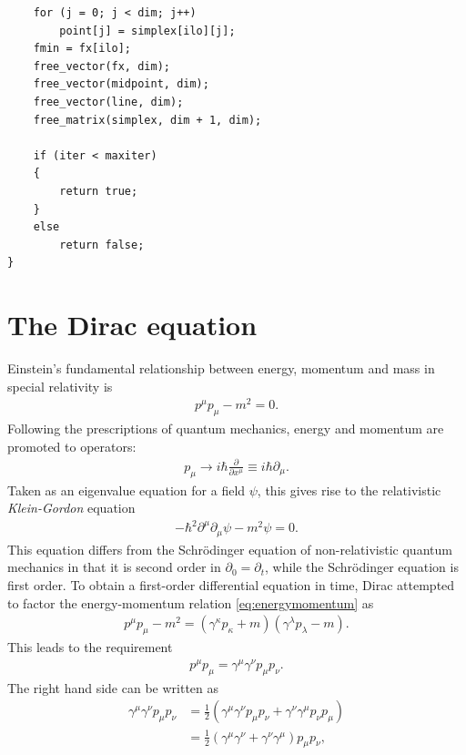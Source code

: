 \documentclass[twoside,english]{uiofysmaster}
\begin{document}
\begin{lstlisting}
	for (j = 0; j < dim; j++)
		point[j] = simplex[ilo][j];
	fmin = fx[ilo];
	free_vector(fx, dim);
	free_vector(midpoint, dim);
	free_vector(line, dim);
	free_matrix(simplex, dim + 1, dim);

	if (iter < maxiter)
	{
		return true;
	}
	else
		return false;
}
\end{lstlisting}




\chapter{The Dirac equation}
\label{appendix:diraceq}

Einstein's fundamental relationship between energy, momentum and mass in special relativity is
\begin{align}
  p^\mu p_\mu - m^2 = 0.\label{eq:energymomentum}
\end{align}
Following the prescriptions of quantum mechanics, energy and momentum are promoted to operators:
\begin{align}
	p_\mu \to i\hbar \frac{\partial}{\partial x^\mu} \equiv i\hbar \partial_\mu.
\end{align}
Taken as an eigenvalue equation for a field $\psi$, this gives rise to the relativistic {\it Klein-Gordon} equation
\begin{align}
	-\hbar^2 \partial^\mu \partial_\mu \psi - m^2 \psi = 0.
\end{align}
This equation differs from the Schr\"{o}dinger equation of non-relativistic quantum mechanics in that it is second order in $\partial_{0} = \partial_t$, while the Schr\"{o}dinger equation is first order. To obtain a first-order differential equation in time, Dirac attempted \cite{griffiths:elementary_particles} to factor the energy-momentum relation \eqref{eq:energymomentum} as
\begin{align}
	p^\mu p_\mu - m^2 = \left(\gamma^\kappa p_\kappa + m\right)\left(\gamma^\lambda p_\lambda - m\right).
\end{align}
This leads to the requirement
\begin{align}
	p^\mu p_\mu = \gamma^\mu \gamma^\nu p_\mu p_\nu.
\end{align}
The right hand side can be written as
\begin{align}
	\gamma^\mu \gamma^\nu p_\mu p_\nu &= \frac{1}{2}\left( \gamma^\mu \gamma^\nu p_\mu p_\nu + \gamma^\nu \gamma^\mu p_\nu p_\mu \right)\\
	&= \frac{1}{2}\left( \gamma^\mu \gamma^\nu  + \gamma^\nu \gamma^\mu \right) p_\mu p_\nu,
\end{align}
\end{document}
